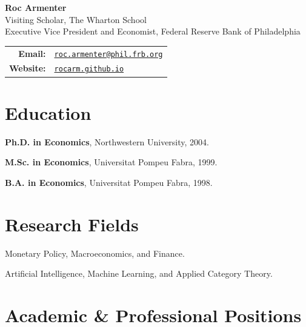 \documentclass[letterpaper, 12pt]{article}
\def\name{Roc Armenter}
\newenvironment{itemize2}{
  \begin{list}{}{
    \setlength{\leftmargin}{1.5em}
  }
}{
  \end{list}
}
\begin{document}
\begin{center}
  \Huge \textbf{\name} \\
  \smallskip
  \large Visiting Scholar, The Wharton School \\
  \large Executive Vice President and Economist, Federal Reserve Bank of Philadelphia
\end{center}

\vspace{0.1in}

\begin{center}
  \begin{tabular}{rl}
    \textbf{Email:} & \href{mailto:roc.armenter@phil.frb.org}{\tt roc.armenter@phil.frb.org} \\
    \textbf{Website:} & \href{https://rocarm.github.io/}{\tt rocarm.github.io} \\
  \end{tabular}
\end{center}

\section*{Education}

\begin{itemize2}
  \item \textbf{Ph.D. in Economics}, Northwestern University, 2004.
  \item \textbf{M.Sc. in Economics}, Universitat Pompeu Fabra, 1999.
  \item \textbf{B.A. in Economics}, Universitat Pompeu Fabra, 1998.
\end{itemize2}

\section*{Research Fields}

\begin{itemize2}
    \item Monetary Policy, Macroeconomics, and Finance.
    \item Artificial Intelligence, Machine Learning, and Applied Category Theory.
\end{itemize2}

\section*{Academic \& Professional Positions}
\end{document}
